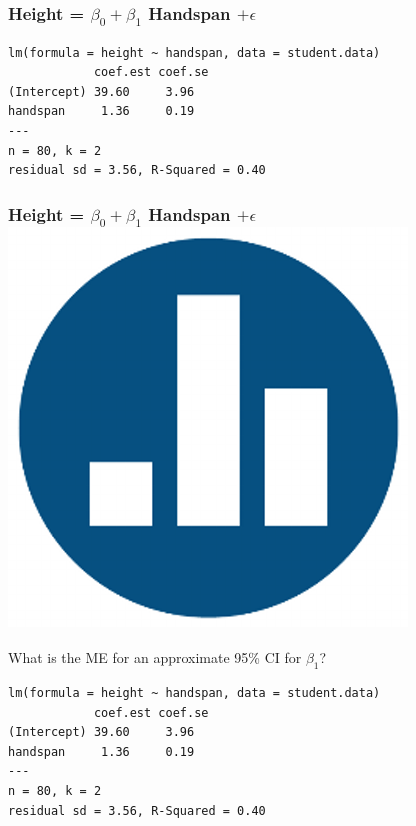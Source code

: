 \begin{frame}[fragile]
\frametitle{Height = $\beta_0 + \beta_1$ Handspan $+ \epsilon$}
\footnotesize
\begin{verbatim}
lm(formula = height ~ handspan, data = student.data)
            coef.est coef.se
(Intercept) 39.60     3.96  
handspan     1.36     0.19  
---
n = 80, k = 2
residual sd = 3.56, R-Squared = 0.40
\end{verbatim}

\end{frame}
\begin{frame}[fragile]
\frametitle{Height = $\beta_0 + \beta_1$ Handspan $+ \epsilon$ \hfill \includegraphics[scale = 0.05]{./images/clicker}}
\alert{What is the ME for an approximate 95\% CI for $\beta_1$?}
\footnotesize
\begin{verbatim}
lm(formula = height ~ handspan, data = student.data)
            coef.est coef.se
(Intercept) 39.60     3.96  
handspan     1.36     0.19  
---
n = 80, k = 2
residual sd = 3.56, R-Squared = 0.40
\end{verbatim}
\end{frame}

